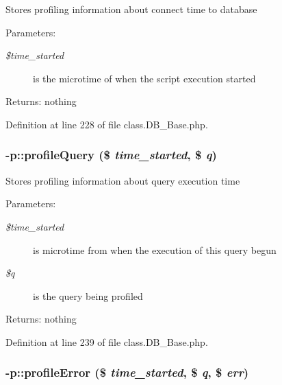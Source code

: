 Stores profiling information about connect time to database \begin{Desc}
\item[Parameters:]
\begin{description}
\item[{\em \$time\_\-started}]is the microtime of when the script execution started \end{description}
\end{Desc}
\begin{Desc}
\item[Returns:]nothing \end{Desc}


Definition at line 228 of file class.DB\_\-Base.php.
\subsubsection{-p::profileQuery (\$ {\em time\_\-started}, \$ {\em q})}\label{protocolDB__Base-p_208dae69c6795556b467b12c782f04d4}


Stores profiling information about query execution time \begin{Desc}
\item[Parameters:]
\begin{description}
\item[{\em \$time\_\-started}]is microtime from when the execution of this query begun \item[{\em \$q}]is the query being profiled \end{description}
\end{Desc}
\begin{Desc}
\item[Returns:]nothing \end{Desc}


Definition at line 239 of file class.DB\_\-Base.php.
\subsubsection{-p::profileError (\$ {\em time\_\-started}, \$ {\em q}, \$ {\em err})}\label{protocolDB__Base-p_bac0f01244c58053bda07dc9005dbc13}


